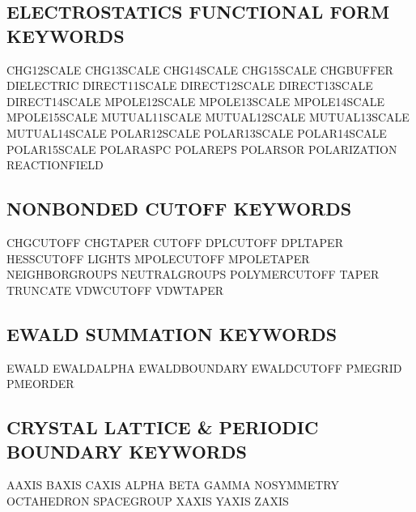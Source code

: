 \documentclass[letterpaper,11pt,english]{sphinxmanual}
\begin{document}
\subsection{ELECTROSTATICS FUNCTIONAL FORM KEYWORDS}
\label{\detokenize{text/keywords:electrostatics-functional-form-keywords}}
CHG\sphinxhyphen{}12\sphinxhyphen{}SCALE    CHG\sphinxhyphen{}13\sphinxhyphen{}SCALE    CHG\sphinxhyphen{}14\sphinxhyphen{}SCALE
CHG\sphinxhyphen{}15\sphinxhyphen{}SCALE    CHG\sphinxhyphen{}BUFFER      DIELECTRIC
DIRECT\sphinxhyphen{}11\sphinxhyphen{}SCALE DIRECT\sphinxhyphen{}12\sphinxhyphen{}SCALE DIRECT\sphinxhyphen{}13\sphinxhyphen{}SCALE
DIRECT\sphinxhyphen{}14\sphinxhyphen{}SCALE MPOLE\sphinxhyphen{}12\sphinxhyphen{}SCALE  MPOLE\sphinxhyphen{}13\sphinxhyphen{}SCALE
MPOLE\sphinxhyphen{}14\sphinxhyphen{}SCALE  MPOLE\sphinxhyphen{}15\sphinxhyphen{}SCALE  MUTUAL\sphinxhyphen{}11\sphinxhyphen{}SCALE
MUTUAL\sphinxhyphen{}12\sphinxhyphen{}SCALE MUTUAL\sphinxhyphen{}13\sphinxhyphen{}SCALE MUTUAL\sphinxhyphen{}14\sphinxhyphen{}SCALE
POLAR\sphinxhyphen{}12\sphinxhyphen{}SCALE  POLAR\sphinxhyphen{}13\sphinxhyphen{}SCALE  POLAR\sphinxhyphen{}14\sphinxhyphen{}SCALE
POLAR\sphinxhyphen{}15\sphinxhyphen{}SCALE  POLAR\sphinxhyphen{}ASPC      POLAR\sphinxhyphen{}EPS
POLAR\sphinxhyphen{}SOR       POLARIZATION    REACTIONFIELD


\subsection{NONBONDED CUTOFF KEYWORDS}
\label{\detokenize{text/keywords:nonbonded-cutoff-keywords}}
CHG\sphinxhyphen{}CUTOFF      CHG\sphinxhyphen{}TAPER       CUTOFF
DPL\sphinxhyphen{}CUTOFF      DPL\sphinxhyphen{}TAPER       HESS\sphinxhyphen{}CUTOFF
LIGHTS  MPOLE\sphinxhyphen{}CUTOFF    MPOLE\sphinxhyphen{}TAPER
NEIGHBOR\sphinxhyphen{}GROUPS NEUTRAL\sphinxhyphen{}GROUPS  POLYMER\sphinxhyphen{}CUTOFF
TAPER   TRUNCATE        VDW\sphinxhyphen{}CUTOFF
VDW\sphinxhyphen{}TAPER


\subsection{EWALD SUMMATION KEYWORDS}
\label{\detokenize{text/keywords:ewald-summation-keywords}}
EWALD   EWALD\sphinxhyphen{}ALPHA     EWALD\sphinxhyphen{}BOUNDARY
EWALD\sphinxhyphen{}CUTOFF    PME\sphinxhyphen{}GRID        PME\sphinxhyphen{}ORDER


\subsection{CRYSTAL LATTICE \& PERIODIC BOUNDARY KEYWORDS}
\label{\detokenize{text/keywords:crystal-lattice-periodic-boundary-keywords}}
A\sphinxhyphen{}AXIS  B\sphinxhyphen{}AXIS  C\sphinxhyphen{}AXIS
ALPHA   BETA    GAMMA
NO\sphinxhyphen{}SYMMETRY     OCTAHEDRON      SPACEGROUP
X\sphinxhyphen{}AXIS  Y\sphinxhyphen{}AXIS  Z\sphinxhyphen{}AXIS
\end{document}
